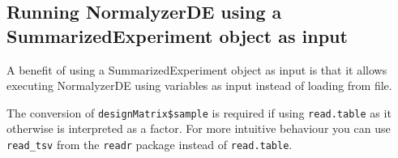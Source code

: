 \documentclass[]{article}
\begin{document}
\hypertarget{running-normalyzerde-using-a-summarizedexperiment-object-as-input}{%
\subsection{Running NormalyzerDE using a SummarizedExperiment object as input}\label{running-normalyzerde-using-a-summarizedexperiment-object-as-input}}

A benefit of using a SummarizedExperiment object as input is that it allows executing NormalyzerDE using variables as input instead of loading from file.

The conversion of \texttt{designMatrix\$sample} is required if using \texttt{read.table} as it otherwise is interpreted as a factor. For more intuitive behaviour you can use \texttt{read\_tsv} from the \texttt{readr} package instead of \texttt{read.table}.
\end{document}
